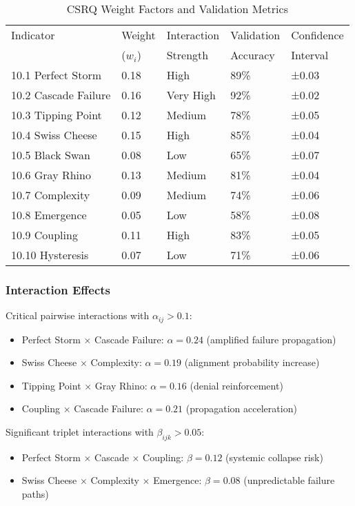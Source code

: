 \documentclass[11pt,a4paper]{article}
\begin{document}
\begin{table}[H]
\centering
\caption{CSRQ Weight Factors and Validation Metrics}
\label{tab:csrq_weights}
\begin{tabular}{lllll}
\toprule
Indicator & Weight & Interaction & Validation & Confidence \\
& ($w_i$) & Strength & Accuracy & Interval \\
\midrule
10.1 Perfect Storm & 0.18 & High & 89\% & ±0.03 \\
10.2 Cascade Failure & 0.16 & Very High & 92\% & ±0.02 \\
10.3 Tipping Point & 0.12 & Medium & 78\% & ±0.05 \\
10.4 Swiss Cheese & 0.15 & High & 85\% & ±0.04 \\
10.5 Black Swan & 0.08 & Low & 65\% & ±0.07 \\
10.6 Gray Rhino & 0.13 & Medium & 81\% & ±0.04 \\
10.7 Complexity & 0.09 & Medium & 74\% & ±0.06 \\
10.8 Emergence & 0.05 & Low & 58\% & ±0.08 \\
10.9 Coupling & 0.11 & High & 83\% & ±0.05 \\
10.10 Hysteresis & 0.07 & Low & 71\% & ±0.06 \\
\bottomrule
\end{tabular}
\end{table}

\FloatBarrier

\subsubsection{Interaction Effects}

Critical pairwise interactions with $\alpha_{ij} > 0.1$:
\begin{itemize}
\item Perfect Storm × Cascade Failure: $\alpha = 0.24$ (amplified failure propagation)
\item Swiss Cheese × Complexity: $\alpha = 0.19$ (alignment probability increase)
\item Tipping Point × Gray Rhino: $\alpha = 0.16$ (denial reinforcement)
\item Coupling × Cascade Failure: $\alpha = 0.21$ (propagation acceleration)
\end{itemize}

Significant triplet interactions with $\beta_{ijk} > 0.05$:
\begin{itemize}
\item Perfect Storm × Cascade × Coupling: $\beta = 0.12$ (systemic collapse risk)
\item Swiss Cheese × Complexity × Emergence: $\beta = 0.08$ (unpredictable failure paths)
\end{itemize}
\end{document}

